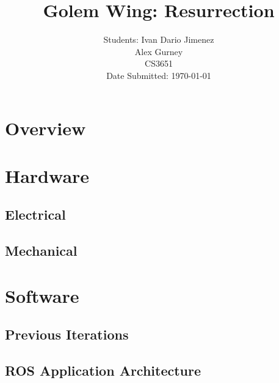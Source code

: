 \documentclass[12pt,conference,onecolumn,titlepage]{IEEEtran} %
\begin{document}
\title{Golem Wing: Resurrection}
\author{Students: Ivan Dario Jimenez\\
Alex Gurney \\
CS3651\\
Date Submitted: \today \\}

\maketitle

\section{Overview}
\label{sec:overview}

\section{Hardware}
\label{sec:hardware}
\subsection{Electrical}
\label{sec:electrical}
\subsection{Mechanical}
\label{sec:mechanical}
\section{Software}
\label{sec:software}

\subsection{Previous Iterations}
\label{sec:previous-iterations}

\subsection{ROS Application Architecture}
\label{sec:ros-appl-arch}
\end{document}
